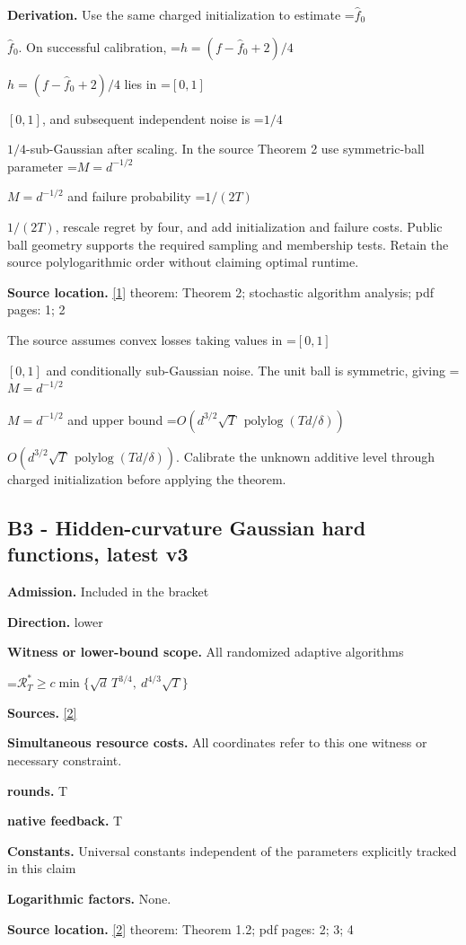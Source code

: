 \documentclass[10pt,a4paper]{article}
\newcommand{\AtlasMath}[1]{\par\begingroup\centering\setbox0=\hbox{$\displaystyle #1$}\ifdim\wd0>1.4\linewidth\typeout{ATLAS WIDE FORMULA: \the\wd0}\fi\ifdim\wd0>\linewidth\resizebox{\linewidth}{!}{\box0}\else\box0\fi\par\endgroup}
\newcommand{\AtlasInlineMath}[1]{\begingroup\setbox0=\hbox{$#1$}\ifdim\wd0>.4\linewidth\endgroup\AtlasMath{#1}\else\endgroup$#1$\fi}
\begin{document}
\textbf{Derivation.} Use the same charged initialization to estimate \AtlasInlineMath{\widehat f_0}. On successful calibration, \AtlasInlineMath{h=(f-\widehat f_0+2)/4} lies in \AtlasInlineMath{[0,1]}, and subsequent independent noise is \AtlasInlineMath{1/4}-sub-Gaussian after scaling. In the source Theorem 2 use symmetric-ball parameter \AtlasInlineMath{M=d^{-1/2}} and failure probability \AtlasInlineMath{1/(2T)}, rescale regret by four, and add initialization and failure costs. Public ball geometry supports the required sampling and membership tests. Retain the source polylogarithmic order without claiming optimal runtime.

\textbf{Source location.} \href{https://arxiv.org/pdf/2406.06506v1}{[1]} theorem: Theorem 2; stochastic algorithm analysis; pdf pages: 1; 2

The source assumes convex losses taking values in \AtlasInlineMath{[0,1]} and conditionally sub-Gaussian noise. The unit ball is symmetric, giving \AtlasInlineMath{M=d^{-1/2}} and upper bound \AtlasInlineMath{O(d^{3/2}\sqrt T\,\operatorname{polylog}(Td/\delta))}. Calibrate the unknown additive level through charged initialization before applying the theorem.

\subsection{B3 - Hidden-curvature Gaussian hard functions, latest v3}
\textbf{Admission.} Included in the bracket

\textbf{Direction.} lower

\textbf{Witness or lower-bound scope.} All randomized adaptive algorithms

\AtlasMath{\mathcal{R}_T^*\ge c\min\{\sqrt d\,T^{3/4},\ d^{4/3}\sqrt T\}}
\textbf{Sources.} \href{https://arxiv.org/pdf/2607.18652v3}{[2]}

\textbf{Simultaneous resource costs.} All coordinates refer to this one witness or necessary constraint.

\textbf{rounds.} T

\textbf{native feedback.} T

\textbf{Constants.} Universal constants independent of the parameters explicitly tracked in this claim

\textbf{Logarithmic factors.} None.

\textbf{Source location.} \href{https://arxiv.org/pdf/2607.18652v3}{[2]} theorem: Theorem 1.2; pdf pages: 2; 3; 4
\end{document}
